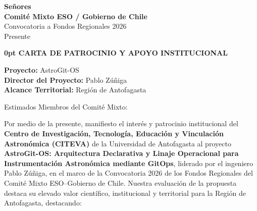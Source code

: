 \documentclass[letterpaper,11pt]{article}
\begin{document}
\begin{flushright}
\end{flushright}

\vspace{0.3cm}

\begin{raggedright}
    \small
    \textbf{\color{primary} Señores} \\
    \textbf{\color{primary} Comité Mixto ESO / Gobierno de Chile} \\
    Convocatoria a Fondos Regionales 2026 \\
    Presente \\
\end{raggedright}

\vspace{1cm}

\begin{center}
    \color{primary} \bfseries \fontsize {12pt} {0pt} \selectfont
    CARTA DE PATROCINIO Y APOYO INSTITUCIONAL
\end{center}

\vspace{0.5cm}

    \color{primary} \small
    \textbf{Proyecto:} AstroGit-OS \\
    \textbf{Director del Proyecto:} Pablo Zúñiga \\
    \textbf{Alcance Territorial:} Región de Antofagasta \vspace{0.3cm}

Estimados Miembros del Comité Mixto: \vspace{0.3cm}

Por medio de la presente, manifiesto el interés y patrocinio institucional del \textbf{Centro de Investigación, Tecnología, Educación y Vinculación Astronómica (CITEVA)} de la Universidad de Antofagasta al proyecto \textbf{AstroGit-OS: Arquitectura Declarativa y Linaje Operacional para Instrumentación Astronómica mediante GitOps}, liderado por el ingeniero Pablo Zúñiga, en el marco de la Convocatoria 2026 de los Fondos Regionales del Comité Mixto ESO--Gobierno de Chile. Nuestra evaluación de la propuesta destaca su elevado valor científico, institucional y territorial para la Región de Antofagasta, destacando:
\end{document}
